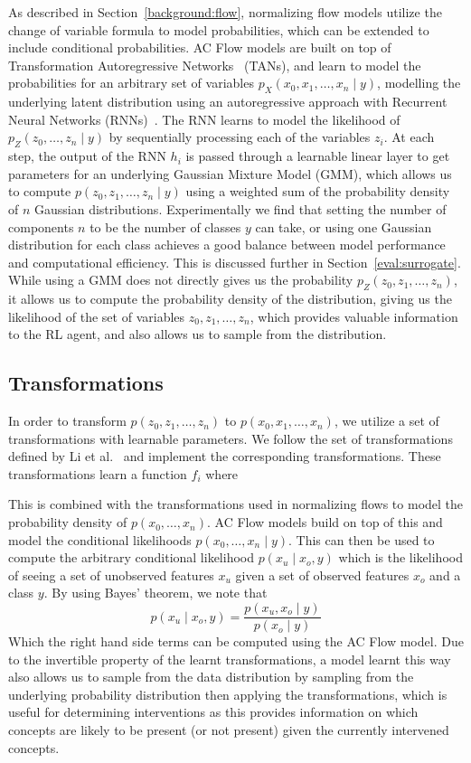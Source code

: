 \documentclass[../main.tex]{subfiles}
\begin{document}
As described in Section~\ref{background:flow}, 
normalizing flow models utilize the change of variable formula to model probabilities,
which can be extended to include conditional probabilities. AC Flow models are built on top of
Transformation Autoregressive
Networks~\cite{tans} (TANs), and learn to model 
the probabilities for an arbitrary set of variables $p_X(x_0, x_1, \ldots, x_n \mid y)$,
modelling the underlying latent distribution using an autoregressive approach with Recurrent
Neural Networks (RNNs)~\cite{rnn}. The RNN learns to model the likelihood of 
$p_Z(z_0, \ldots, z_n \mid y)$ by sequentially processing each of the variables $z_i$.
At each step, the output of the RNN $h_i$ is 
passed through a learnable linear layer to get parameters for an underlying Gaussian Mixture Model (GMM),
which allows us to compute $p(z_0, z_1, \ldots, z_n \mid y)$ using a weighted
sum of the probability density of $n$ Gaussian distributions. Experimentally
we find that setting the number of components $n$ to be the number of classes 
$y$ can take, or using one Gaussian distribution for each class 
achieves
a good balance between model performance and computational efficiency.
This is discussed further in Section~\ref{eval:surrogate}.
While using a GMM does not directly gives us the probability
$p_Z(z_0, z_1, \ldots, z_n)$, it allows us to compute the probability density of the distribution, giving 
us the likelihood of the set of variables $z_0, z_1, \ldots, z_n$, which provides valuable information
to the RL agent, and also allows us to sample from the distribution.

\subsection{Transformations}

In order to transform $p(z_0, z_1, \ldots, z_n)$ to $p(x_0, x_1, \ldots, x_n)$, we
utilize a set of transformations with learnable parameters. We follow the 
set of transformations defined by Li et al.~\cite{acflow} and implement the corresponding
transformations. These transformations learn a function $f_i$ where

This is combined with the transformations used in normalizing flows to 
model the probability density of $p(x_0, \ldots, x_n)$. 
AC Flow models
build on top of this and model the conditional likelihoods $p(x_0, \ldots, x_n \mid y)$.
This can then be used to compute the arbitrary conditional likelihood $p(x_u \mid x_o, y)$
which is the likelihood of 
seeing a set of unobserved features $x_u$
given a set of observed features $x_o$ and a class $y$. 
By using Bayes' theorem, we note that
\[p(x_u \mid x_o, y) = \frac{p(x_u, x_o \mid y)}{p(x_o \mid y)}\]
Which the right hand side terms can be computed using the AC Flow model.
Due to the invertible property of the learnt transformations,
a model learnt this way also allows us to sample from the data distribution
by sampling from the underlying probability distribution then applying the transformations, which is useful for
determining interventions as
this provides information on which concepts are likely to be present (or not present) given the currently intervened
concepts.
\end{document}
